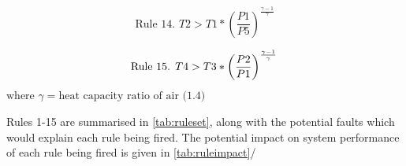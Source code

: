 \begin{equation}
\text{Rule 14. } T2 > T1 * \left(\frac{P1}{P5}\right)^\frac{\gamma-1}{\gamma}
\label{eq:rule14}
\end{equation}

\begin{equation}
\text{Rule 15. } T4 > T3 * \left(\frac{P2}{P1}\right)^\frac{\gamma-1}{\gamma} \\
\label{eq:rule15}
\end{equation}
$\text{where } \gamma = \text{heat capacity ratio of air (1.4)}$

Rules 1-15 are summarised in \autoref{tab:ruleset}, along with the potential faults which would explain each rule being fired. The potential impact on system performance of each rule being fired is given in \autoref{tab:ruleimpact}/

